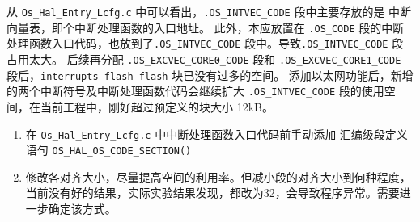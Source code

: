 从 \lstinline{Os_Hal_Entry_Lcfg.c} 中可以看出，\lstinline{.OS_INTVEC_CODE} 段中主要存放的是 中断向量表，即个中断处理函数的入口地址。
此外，本应放置在 \lstinline{.OS_CODE} 段的中断处理函数入口代码，也放到了\lstinline{.OS_INTVEC_CODE} 段中。导致\lstinline{.OS_INTVEC_CODE} 段占用太大。
后续再分配 \lstinline{.OS_EXCVEC_CORE0_CODE} 段和 \lstinline{.OS_EXCVEC_CORE1_CODE} 段后，\lstinline{interrupts_flash flash} 块已没有过多的空间。
添加以太网功能后，新增的两个中断符号及中断处理函数代码会继续扩大 \lstinline{.OS_INTVEC_CODE} 段的使用空间，在当前工程中，刚好超过预定义的块大小 12kB。

\begin{definition}[解决方案]
    \begin{enumerate}
        \item 在 \lstinline{Os_Hal_Entry_Lcfg.c} 中中断处理函数入口代码前手动添加 汇编级段定义语句 \lstinline{OS_HAL_OS_CODE_SECTION()}
        \item 修改各对齐大小，尽量提高空间的利用率。但减小段的对齐大小到何种程度，当前没有好的结果，实际实验结果发现，都改为32，会导致程序异常。需要进一步确定该方式。
    \end{enumerate}
\end{definition}

